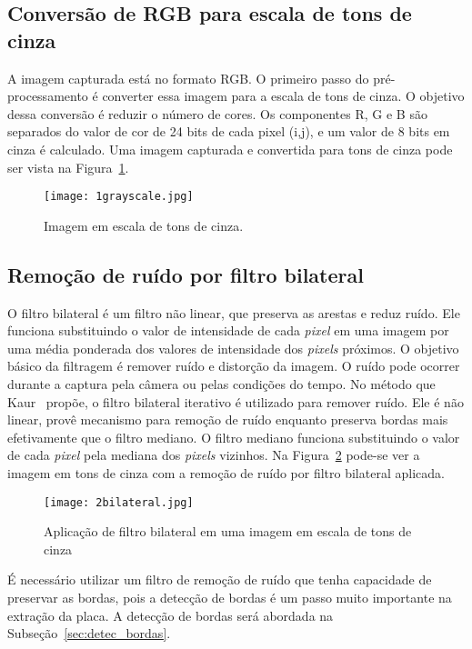 \subsection{Conversão de RGB para escala de tons de cinza}

A imagem capturada está no formato RGB\@. O primeiro passo do pré-processamento
é converter essa imagem para a escala de tons de cinza. O objetivo dessa
conversão é reduzir o número de cores. Os componentes R, G e B são separados do
valor de cor de 24 bits de cada pixel (i,j), e um valor de 8 bits em cinza é
calculado. Uma imagem capturada e convertida para tons de cinza pode ser vista
na Figura~\ref{fig:ext_gray_scale}.

\begin{figure}[H]
	\centering
	\texttt{[image: 1grayscale.jpg]}
	\caption{Imagem em escala de tons de cinza.}
	\label{fig:ext_gray_scale}
\end{figure}

\subsection{Remoção de ruído por filtro bilateral}

O filtro bilateral é um filtro não linear, que preserva as arestas e reduz
ruído. Ele funciona substituindo o valor de intensidade de cada \emph{pixel} em
uma imagem por uma média ponderada dos valores de intensidade dos \emph{pixels}
próximos. O objetivo básico da filtragem é remover ruído e distorção da imagem.
O ruído pode ocorrer durante a captura pela câmera ou pelas condições do tempo.
No método que Kaur~\cite{kaur2014efficient} propõe, o filtro bilateral iterativo
é utilizado para remover ruído. Ele é não linear, provê mecanismo para remoção
de ruído enquanto preserva bordas mais efetivamente que o filtro mediano. O
filtro mediano funciona substituindo o valor de cada \emph{pixel} pela mediana
dos \emph{pixels} vizinhos. Na Figura~\ref{fig:ext_filter_in_gray_scale} pode-se
ver a imagem em tons de cinza com a remoção de ruído por filtro bilateral
aplicada.

\begin{figure}[H]
	\centering
	\texttt{[image: 2bilateral.jpg]}
	\caption{Aplicação de filtro bilateral em uma imagem em escala de tons de cinza}
	\label{fig:ext_filter_in_gray_scale}
\end{figure}

É necessário utilizar um filtro de remoção de ruído que tenha capacidade de
preservar as bordas, pois a detecção de bordas é um passo muito importante na
extração da placa. A detecção de bordas será abordada na
Subseção~\ref{sec:detec_bordas}.

